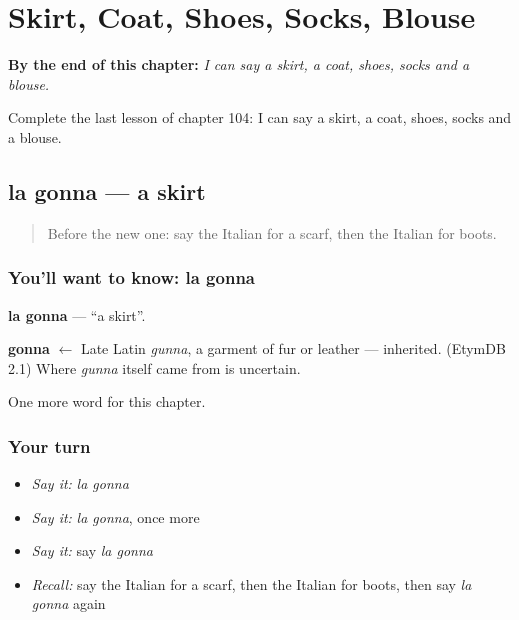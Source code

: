 
\chapter{Skirt, Coat, Shoes, Socks, Blouse}
\label{ch:it-skirt-coat-shoes-socks-blouse}

\begin{chapteropening}
\textbf{By the end of this chapter:} \emph{I can say a skirt, a coat, shoes, socks and a blouse.}

Complete the last lesson of chapter 104: I can say a skirt, a coat, shoes, socks and a blouse.
\end{chapteropening}

\section[la gonna]{la gonna — a skirt}

\label{lesson:IT-C104-gonna}



\begin{quote}
Before the new one: say the Italian for a scarf, then the Italian for boots.
\end{quote}

\subsection*{You'll want to know: la gonna}
\textbf{la gonna} — \textquotedblleft{}a skirt\textquotedblright{}.

\begin{cousinweb}
\textbf{gonna} $\leftarrow$ Late Latin \emph{gunna}, a garment of fur or leather — inherited. (EtymDB 2.1) Where \emph{gunna} itself came from is uncertain.
\end{cousinweb}

\begin{grammarlens}[title={What you've built}]
One more word for this chapter.
\end{grammarlens}

\subsection*{Your turn}
\begin{itemize}
\raggedright
  \item \emph{Say it:} \emph{la gonna}
  \item \emph{Say it:} \emph{la gonna}, once more
  \item \emph{Say it:} say \emph{la gonna}
  \item \emph{Recall:} say the Italian for a scarf, then the Italian for boots, then say \emph{la gonna} again
\end{itemize}

